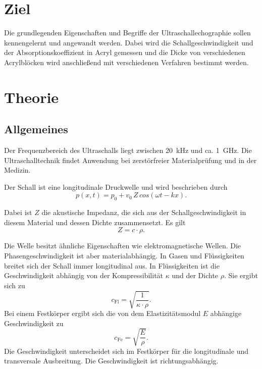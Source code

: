 \section{Ziel}

Die grundlegenden Eigenschaften und Begriffe der
Ultraschallechographie sollen kennengelernt und angewandt
werden. Dabei wird die Schallgeschwindigkeit und der Absorptionskoeffizient in Acryl gemessen und die Dicke von verschiedenen Acrylblöcken wird anschließend mit verschiedenen Verfahren bestimmt werden. %

\section{Theorie}
\label{sec:Theorie}
\subsection{Allgemeines} %
Der Frequenzbereich des Ultraschalls liegt zwischen 
\SI{20}{\kilo\hertz} und ca. \SI{1}{\giga\hertz}. 
Die Ultraschalltechnik findet Anwendung bei 
zerstörfreier Materialprüfung und in der Medizin. 

\noindent Der Schall ist eine longitudinale Druckwelle und wird 
beschrieben durch
\begin{equation*}
    p(x,t) = p_0 + v_0 \, Z \, cos(\omega t - kx).
\end{equation*}

\noindent Dabei ist $Z$ die akustische Impedanz, die sich aus der 
Schallgeschwindigkeit in diesem Material und dessen Dichte 
zusammensetzt. Es gilt 
\begin{equation*}
    Z = c \cdot \rho.
\end{equation*}

\noindent Die Welle besitzt ähnliche Eigenschaften wie 
elektromagnetische Wellen. Die Phasengeschwindigkeit 
ist aber materialabhängig. 
In Gasen und Flüssigkeiten breitet 
sich der Schall immer longitudinal aus. In Flüssigkeiten ist 
die Geschwindigkeit abhängig von der Kompressibilität 
$\kappa$ und der Dichte $\rho$. 
Sie ergibt sich zu 
\begin{equation*}
    c_{\text{Fl}}= \sqrt{\frac{1}{\kappa \cdot \rho}}.
\end{equation*}
Bei einem Festkörper ergibt sich die von dem Elastizitätsmodul
$E$ abhängige Geschwindigkeit zu 
\begin{equation*}
    c_{\text{Fe}}= \sqrt{\frac{E}{\rho}}.
\end{equation*}
Die Geschwindigkeit unterscheidet 
sich im Festkörper für die longitudinale und
transversale Ausbreitung. Die Geschwindigkeit ist richtungsabhängig.

